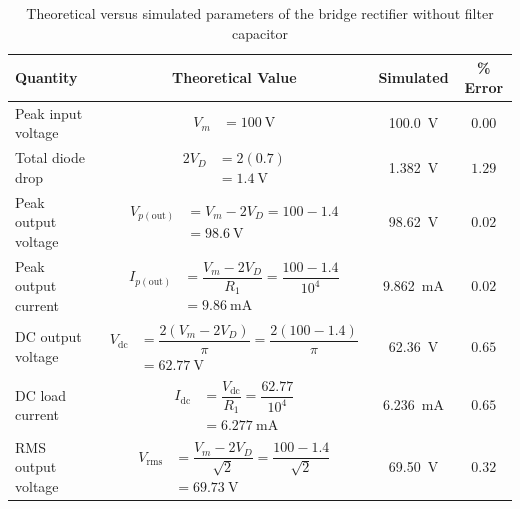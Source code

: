 \documentclass[12pt,a4paper]{article}
\begin{document}
	\begin{table}[H]
		\centering
		\caption{Theoretical versus simulated parameters of the bridge
			rectifier without filter capacitor}
		\label{tab:compare-1}
		\footnotesize
		\renewcommand{\arraystretch}{1.7}
		\setlength{\extrarowheight}{5pt}
		\setlength{\tabcolsep}{17pt}
		\begin{tabular}{|>{\raggedright\arraybackslash}p{2.7cm}|c|c|c|}
			\hline
			\textbf{Quantity} & \textbf{Theoretical Value} & \textbf{Simulated} & \textbf{\% Error} \\
			\hline
			Peak input voltage & $\begin{aligned}V_m &= \SI{100}{\volt}\end{aligned}$ & \SI{100.0}{\volt} & $0.00$ \\
			\hline
			Total diode drop & $\begin{aligned}2V_D &= 2(0.7) \\ &= \SI{1.4}{\volt}\end{aligned}$ & \SI{1.382}{\volt} & $1.29$ \\
			\hline
			Peak output voltage & $\begin{aligned}V_{p(\mathrm{out})} &= V_m-2V_D = 100-1.4 \\ &= \SI{98.6}{\volt}\end{aligned}$ & \SI{98.62}{\volt} & $0.02$ \\
			\hline
			Peak output current & $\begin{aligned}I_{p(\mathrm{out})} &= \dfrac{V_m-2V_D}{R_1} = \dfrac{100-1.4}{10^{4}} \\ &= \SI{9.86}{\milli\ampere}\end{aligned}$ & \SI{9.862}{\milli\ampere} & $0.02$ \\
			\hline
			DC output voltage & $\begin{aligned}V_{\mathrm{dc}} &= \dfrac{2(V_m-2V_D)}{\pi} = \dfrac{2(100-1.4)}{\pi} \\ &= \SI{62.77}{\volt}\end{aligned}$ & \SI{62.36}{\volt} & $0.65$ \\
			\hline
			DC load current & $\begin{aligned}I_{\mathrm{dc}} &= \dfrac{V_{\mathrm{dc}}}{R_1} = \dfrac{62.77}{10^{4}} \\ &= \SI{6.277}{\milli\ampere}\end{aligned}$ & \SI{6.236}{\milli\ampere} & $0.65$ \\
			\hline
			RMS output voltage & $\begin{aligned}V_{\mathrm{rms}} &= \dfrac{V_m-2V_D}{\sqrt{2}} = \dfrac{100-1.4}{\sqrt{2}} \\ &= \SI{69.73}{\volt}\end{aligned}$ & \SI{69.50}{\volt} & $0.32$ \\

\end{tabular}
\end{table}
\end{document}
